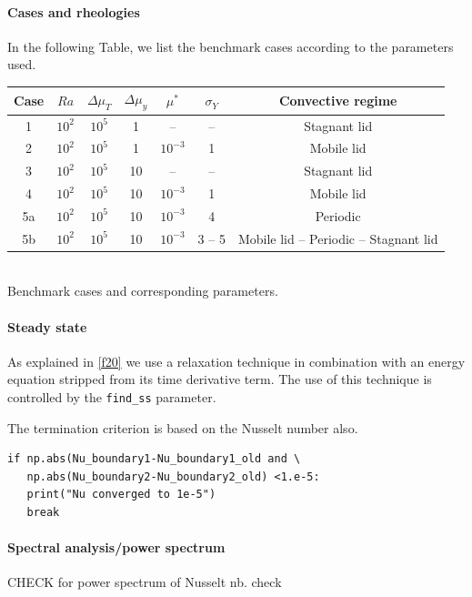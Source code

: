 \paragraph{Cases and rheologies}
In the following Table, we list the benchmark cases according to the parameters used. 
\begin{center}
\begin{tabular}{c c c c c c c} 
\hline
Case & $Ra$ & $\Delta\mu_T$ & $\Delta\mu_y$ & $\mu^*$ & $\sigma_Y$ & Convective regime \\
\hline
1   & $10^2$ & $10^5$    & 1  & -- & --             & Stagnant lid    \\
2   & $10^2$ & $10^5$    & 1  & $10^{-3}$ & 1       & Mobile lid \\
3   & $10^2$ & $10^5$    & 10 & --  & --            & Stagnant lid \\
4   & $10^2$ & $10^5$    & 10 & $10^{-3}$ & 1       & Mobile lid  \\
5a  & $10^2$ & $10^5$    & 10 & $10^{-3}$ & 4       & Periodic  \\
5b  & $10^2$ & $10^5$    & 10 & $10^{-3}$ & 3 -- 5  & Mobile lid -- Periodic -- Stagnant lid \\
\hline
\end{tabular}\\
{\small Benchmark cases and corresponding parameters.} 
\end{center}

\paragraph{Steady state} As explained in \ref{f20} we use a relaxation technique
in combination with an energy equation stripped from its time derivative term. 
The use of this technique is controlled by the {\tt find\_ss} parameter.

The termination criterion is based on the Nusselt number also. 
\begin{lstlisting}
if np.abs(Nu_boundary1-Nu_boundary1_old and \
   np.abs(Nu_boundary2-Nu_boundary2_old) <1.e-5:
   print("Nu converged to 1e-5")
   break
\end{lstlisting}

\paragraph{Spectral analysis/power spectrum}
CHECK \cite{brha09} for power spectrum of Nusselt nb.
check \cite{buri96,mczh05b,puhj95,rozh06,scbg90,wema98,ribr99}



